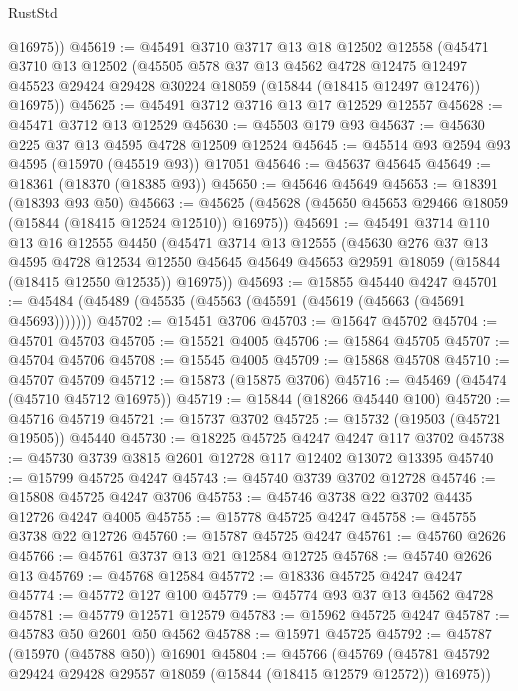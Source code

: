 \begin{lexlean}{RustStd}
\begin{coremodule}
        @16975))
@45619 := @45491
    @3710
    @3717
    @13
    @18
    @12502
    @12558
    (@45471
      @3710
      @13
      @12502
      (@45505
        @578
        @37
        @13
        @4562
        @4728
        @12475
        @12497
        @45523
        @29424
        @29428
        @30224
        @18059
        (@15844 (@18415 @12497 @12476))
        @16975))
@45625 := @45491 @3712 @3716 @13 @17 @12529 @12557
@45628 := @45471 @3712 @13 @12529
@45630 := @45503 @179 @93
@45637 := @45630 @225 @37 @13 @4595 @4728 @12509 @12524
@45645 := @45514 @93 @2594 @93 @4595 (@15970 (@45519 @93)) @17051
@45646 := @45637 @45645
@45649 := @18361 (@18370 (@18385 @93))
@45650 := @45646 @45649
@45653 := @18391 (@18393 @93 @50)
@45663 := @45625 (@45628 (@45650 @45653 @29466 @18059 (@15844 (@18415 @12524 @12510)) @16975))
@45691 := @45491
    @3714
    @110
    @13
    @16
    @12555
    @4450
    (@45471
      @3714
      @13
      @12555
      (@45630
        @276
        @37
        @13
        @4595
        @4728
        @12534
        @12550
        @45645
        @45649
        @45653
        @29591
        @18059
        (@15844 (@18415 @12550 @12535))
        @16975))
@45693 := @15855 @45440 @4247
@45701 := @45484 (@45489 (@45535 (@45563 (@45591 (@45619 (@45663 (@45691 @45693)))))))
@45702 := @15451 @3706
@45703 := @15647 @45702
@45704 := @45701 @45703
@45705 := @15521 @4005
@45706 := @15864 @45705
@45707 := @45704 @45706
@45708 := @15545 @4005
@45709 := @15868 @45708
@45710 := @45707 @45709
@45712 := @15873 (@15875 @3706)
@45716 := @45469 (@45474 (@45710 @45712 @16975))
@45719 := @15844 (@18266 @45440 @100)
@45720 := @45716 @45719
@45721 := @15737 @3702
@45725 := @15732 (@19503 (@45721 @19505)) @45440
@45730 := @18225 @45725 @4247 @4247 @117 @3702
@45738 := @45730 @3739 @3815 @2601 @12728 @117 @12402 @13072 @13395
@45740 := @15799 @45725 @4247
@45743 := @45740 @3739 @3702 @12728
@45746 := @15808 @45725 @4247 @3706
@45753 := @45746 @3738 @22 @3702 @4435 @12726 @4247 @4005
@45755 := @15778 @45725 @4247
@45758 := @45755 @3738 @22 @12726
@45760 := @15787 @45725 @4247
@45761 := @45760 @2626
@45766 := @45761 @3737 @13 @21 @12584 @12725
@45768 := @45740 @2626 @13
@45769 := @45768 @12584
@45772 := @18336 @45725 @4247 @4247
@45774 := @45772 @127 @100
@45779 := @45774 @93 @37 @13 @4562 @4728
@45781 := @45779 @12571 @12579
@45783 := @15962 @45725 @4247
@45787 := @45783 @50 @2601 @50 @4562
@45788 := @15971 @45725
@45792 := @45787 (@15970 (@45788 @50)) @16901
@45804 := @45766
    (@45769 (@45781 @45792 @29424 @29428 @29557 @18059 (@15844 (@18415 @12579 @12572)) @16975))

\end{coremodule}
\end{lexlean}
